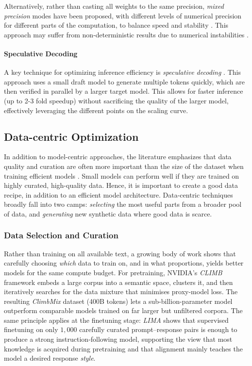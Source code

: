 Alternatively, rather than casting all weights to the same precision, \emph{mixed precision} modes have been proposed, with different levels of numerical precision for different parts of the computation, to balance speed and stability \citep{micikevicius2017mixed}. This approach may suffer from non-deterministic results due to numerical instabilities \citep{yuan2025understanding}.

\paragraph{Speculative Decoding} A key technique for optimizing inference efficiency is \emph{speculative decoding} \citep{leviathan2023fast}. This approach uses a small draft model to generate multiple tokens quickly, which are then verified in parallel by a larger target model. This allows for faster inference (up to 2-3 fold speedup) without sacrificing the quality of the larger model, effectively leveraging the different points on the scaling curve.



\subsection{Data-centric Optimization}
In addition to model-centric approaches, the  literature emphasizes that data quality and curation are often more important than the size of the dataset when training efficient models \citep{luo-etal-2025-survey}. Small models can  perform  well if they are trained on highly curated, high-quality data. Hence, it is important to create a good data recipe, in addition to an efficient model architecture. Data-centric techniques broadly fall into two camps: \emph{selecting} the most useful parts from a broader pool of data, and \emph{generating} new synthetic data where good data is scarce.

\subsubsection{Data Selection and Curation}
Rather than training on all available text, a growing body of work shows that carefully choosing \emph{which} data to train on, and in what proportions, yields better models for the same compute budget. For pretraining, NVIDIA's \emph{CLIMB} framework \citep{diao2026nemotron} embeds a large corpus into a semantic space, clusters it, and then iteratively searches for the data mixture that minimises proxy-model loss. The resulting \emph{ClimbMix} dataset (400B tokens) lets a sub-billion-parameter model outperform comparable models trained on far larger but unfiltered corpora. The same principle applies at the finetuning stage: \emph{LIMA} \citep{zhou2023lima} shows that supervised finetuning on only $1{,}000$ carefully curated prompt--response pairs is enough to produce a strong instruction-following model, supporting the view that most knowledge is acquired during pretraining and that alignment mainly teaches the model a desired response \emph{style}.

